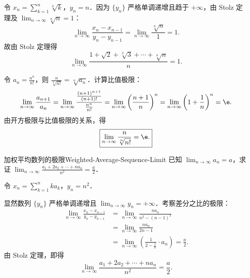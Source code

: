 \begin{solution}

    令 $x_n = \sum_{k=1}^n \sqrt[k]{k}$，$y_n = n$．因为 $\{y_n\}$ 严格单调递增且趋于 $+\infty$，由 Stolz 定理及 $\lim_{n\to\infty} \sqrt[n]{n} = 1$：
    \begin{equation}
        \lim_{n\to\infty} \frac{x_n - x_{n-1}}{y_n - y_{n-1}} = \lim_{n\to\infty} \frac{\sqrt[n]{n}}{1} = 1.
    \end{equation}
    故由 Stolz 定理得
    \begin{equation}
        \boxed{\lim_{n\to\infty} \frac{1 + \sqrt{2} + \sqrt[3]{3} + \cdots + \sqrt[n]{n}}{n} = 1.}
    \end{equation}


    令 $a_n = \frac{n^n}{n!}$，则 $\frac{n}{\sqrt[n]{n!}} = \sqrt[n]{a_n}$．计算比值极限：
    \begin{equation}
        \lim_{n\to\infty} \frac{a_{n+1}}{a_n} = \lim_{n\to\infty} \frac{\frac{(n+1)^{n+1}}{(n+1)!}}{\frac{n^n}{n!}} = \lim_{n\to\infty} \left( \frac{n+1}{n} \right)^n = \lim_{n\to\infty} \left( 1 + \frac{1}{n} \right)^n = \e.
    \end{equation}
    由开方极限与比值极限的关系，得
    \begin{equation}
        \boxed{\lim_{n\to\infty} \frac{n}{\sqrt[n]{n!}} = \e.}
    \end{equation}
\end{solution}

\begin{problem}{加权平均数列的极限}{Weighted-Average-Sequence-Limit}
    已知 $\lim_{n\to\infty} a_n = a$，求证 $\lim_{n\to\infty} \frac{a_1 + 2a_2 + \cdots + n a_n}{n^2} = \frac{a}{2}$．
\end{problem}

\begin{myproof}
    令 $x_n = \sum_{k=1}^n k a_k$，$y_n = n^2$．

    显然数列 $\{y_n\}$ 严格单调递增且 $\lim_{n\to\infty} y_n = +\infty$．考察差分之比的极限：
    \begin{equation}
        \begin{aligned}
            \lim_{n\to\infty} \frac{x_n - x_{n-1}}{y_n - y_{n-1}} & = \lim_{n\to\infty} \frac{n a_n}{n^2 - (n-1)^2}                                       \\
                                                                  & = \lim_{n\to\infty} \frac{n a_n}{2n - 1}                                              \\
                                                                  & = \lim_{n\to\infty} \left( \frac{1}{2 - \frac{1}{n}} \cdot a_n \right) = \frac{a}{2}.
        \end{aligned}
    \end{equation}
    由 Stolz 定理，即得
    \begin{equation}
        \lim_{n\to\infty} \frac{a_1 + 2a_2 + \cdots + n a_n}{n^2} = \frac{a}{2}.
    \end{equation}
\end{myproof}

